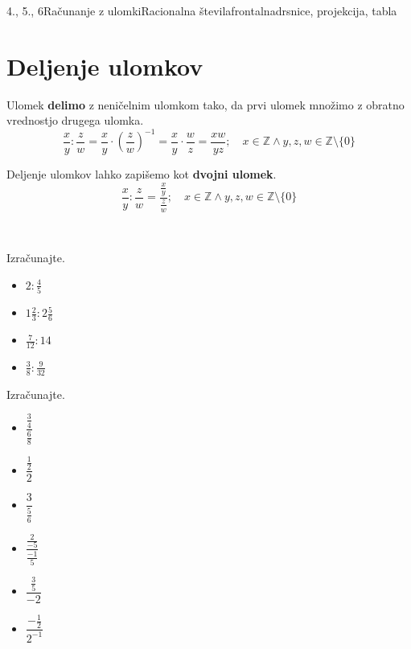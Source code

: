 \begin{priprava}{4., 5., 6}{}{Računanje z ulomki}{Racionalna števila}{frontalna}{drsnice, projekcija, tabla}
    ~

\section{Deljenje ulomkov}


        Ulomek \textbf{delimo} z neničelnim ulomkom tako, da prvi ulomek množimo z obratno vrednostjo drugega ulomka.
        $$\dfrac{x}{y}:\dfrac{z}{w}=\dfrac{x}{y}\cdot\left(\dfrac{z}{w}\right)^{-1}=\dfrac{x}{y}\cdot\dfrac{w}{z}=\dfrac{xw}{yz}; \quad x\in\mathbb{Z}\land y,z,w\in\mathbb{Z}\setminus\{0\} $$
    

    
        Deljenje ulomkov lahko zapišemo kot \textbf{dvojni ulomek}.
        $$\dfrac{x}{y}:\dfrac{z}{w}=\dfrac{\frac{x}{y}}{\frac{z}{w}}; \quad x\in\mathbb{Z}\land y,z,w\in\mathbb{Z}\setminus\{0\} $$
    

        ~





    \begin{naloga}
        Izračunajte.
        \begin{itemize}
            \item $2:\frac{4}{5}$ 
            \item $1\frac{2}{3}:2\frac{5}{6}$ 
            \item $\frac{7}{12}:14$ 
            \item $\frac{3}{8}:\frac{9}{32}$ 
        \end{itemize}
    \end{naloga}




    \begin{naloga}
        Izračunajte.
        \begin{itemize}
                    \item $\dfrac{\frac{3}{4}}{\frac{6}{8}}$ 
                    \item $\dfrac{\frac{1}{2}}{2}$ 
                    \item $\dfrac{3}{\frac{5}{6}}$ 
                    \item $\dfrac{\frac{2}{-5}}{\frac{-1}{5}}$ 
                    \item $\dfrac{\frac{3}{5}}{-2}$ 
                    \item $\dfrac{-\frac{1}{2}}{2^{-1}}$ 

        \end{itemize}
    \end{naloga}





\end{priprava}
